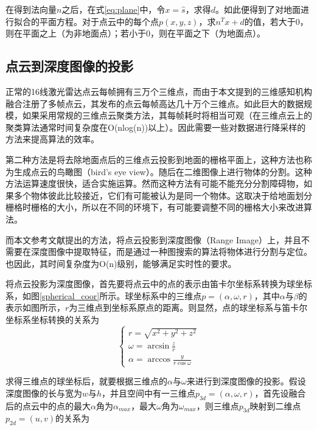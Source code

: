 在得到法向量$n$之后，在式\ref{eq:plane}中，令$x=\hat{s}$，求得$d$。如此便得到了对地面进行拟合的平面方程。对于点云中的每个点$p(x,y,z)$，求$n^Tx+d$的值，若大于0，则在平面之上（为非地面点）；若小于0，则在平面之下（为地面点）。

\subsection{点云到深度图像的投影}

正常的16线激光雷达点云每帧拥有三万个三维点，而由于本文提到的三维感知机构融合注册了多帧点云，其发布的点云每帧高达几十万个三维点。如此巨大的数据规模，如果采用常规的三维点云聚类方法，其每帧耗时将相当可观（在三维点云上的聚类算法通常时间复杂度在O(nlog(n))以上）。因此需要一些对数据进行降采样的方法来提高算法的效率。

第二种方法是将去除地面点后的三维点云投影到地面的栅格平面上，这种方法也称为生成点云的鸟瞰图（bird's eye view）。随后在二维图像上进行物体的分割。这种方法运算速度很快，适合实施运算。然而这种方法有可能不能充分分割障碍物，如果多个物体彼此比较接近，它们有可能被认为是同一个物体。这取决于给地面划分栅格时栅格的大小，所以在不同的环境下，有可能要调整不同的栅格大小来改进算法。


而本文参考文献提出的方法，将点云投影到深度图像（Range Image）上，并且不需要在深度图像中提取特征，而是通过一种图搜索的算法将物体进行分割与定位。也因此，其时间复杂度为O(n)级别，能够满足实时性的要求。

将点云投影为深度图像，首先要将点云中的点的表示由笛卡尔坐标系转换为球坐标系，如图\ref{spherical_coor}所示。球坐标系中的三维点$p=(\alpha, \omega, r)$，其中$\alpha$与$\beta$的表示如图所示，$r$为三维点到坐标系原点的距离。则显然，点的球坐标系与笛卡尔坐标系坐标转换的关系为
\begin{equation}
    \begin{cases}
            r = \sqrt{x^2 + y^2 + z^2} \\
            \omega = \arcsin{\frac{z}{r}} \\
            \alpha = \arccos{\frac{y}{r\cos{\omega}}}
    \end{cases}
\end{equation}

求得三维点的球坐标后，就要根据三维点的$\alpha$与$\omega$来进行到深度图像的投影。假设深度图像的长与宽为$w$与$h$，并且空间中有一三维点$p_{3d}=(\alpha, \omega, r)$，首先设融合后的点云中的点的最大$\alpha$角为$\alpha_{max}$，最大$\omega$角为$\omega_{max}$，则三维点$p_{3d}$映射到二维点$p_{2d}=(u,v)$的关系为

